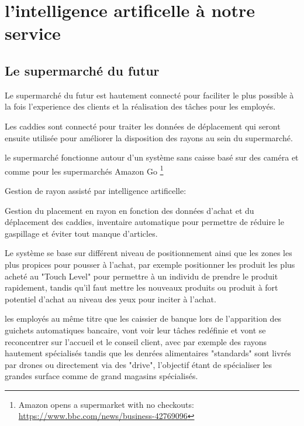 
    \chapter{l'intelligence artificelle à notre service}
    \section{Le supermarché du futur}
    Le supermarché du futur est hautement connecté pour faciliter le plus possible 
    à la fois l'experience des clients et la réalisation des tâches pour 
    les employés. 

    Les caddies sont connecté pour traiter les données de déplacement qui seront 
    ensuite utilisée pour améliorer la disposition des rayons au sein du supermarché.

    le supermarché fonctionne autour d'un système sans caisse basé sur des caméra 
    et comme pour les supermarchés Amazon Go 
    \footnote{Amazon opens a supermarket with no checkouts:  \url{https://www.bbc.com/news/business-42769096}} 
    \newline

    Gestion de rayon assisté par intelligence artificelle: 

    Gestion du placement en rayon en fonction des données d'achat et du déplacement 
    des caddies, inventaire automatique pour permettre de réduire 
    le gaspillage et éviter tout manque d'articles. \newline 

    Le système se base sur différent niveau de positionnement ainsi que les 
    zones les plus propices pour pousser à l'achat, par exemple 
    positionner les produit les plus acheté au "Touch Level" pour permettre 
    à un individu de prendre le produit rapidement, tandis qu'il faut mettre 
    les nouveaux produits ou produit à fort potentiel d'achat au niveau 
    des yeux pour inciter à l'achat. \newline 

    les employés au même titre que les caissier de banque lors de l'apparition
    des guichets automatiques bancaire, vont voir leur tâches redéfinie 
    et vont se reconcentrer sur l'accueil et le conseil client, avec 
    par exemple des rayons hautement spécialisés tandis que les denrées
    alimentaires "standards" sont livrés par drones ou directement via 
    des "drive", l'objectif étant de spécialiser les grandes surface 
    comme de grand magasins spécialisés. \newline 

